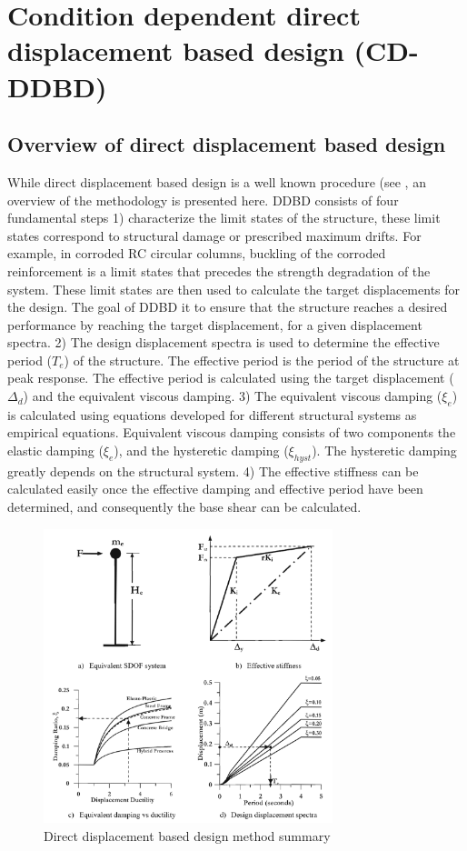 \section{Condition dependent direct displacement based design (CD-DDBD)}
\subsection{Overview of direct displacement based design}

While direct displacement based design is a well known procedure (see \cite{Priestley2007}, an overview of the methodology is presented here. DDBD consists of four fundamental steps 1) characterize the limit states of the structure, these limit states correspond to structural damage or prescribed maximum drifts. For example, in corroded RC circular columns, buckling of the corroded reinforcement is a limit states that precedes the strength degradation of the system. These limit states are then used to calculate the target displacements for the design. The goal of DDBD it to ensure that the structure reaches a desired performance by reaching the target displacement, for a given displacement spectra. 2) The design displacement spectra is used to determine the effective period ($T_e$) of the structure. The effective period is  the period of the structure at peak response. The effective period is calculated using the target displacement ($\Delta_d$) and the equivalent viscous damping. 3) The equivalent viscous damping ($\xi_e$) is calculated using equations developed for different structural systems as empirical equations. Equivalent viscous damping consists of two components the elastic damping ($\xi_e$), and the hysteretic damping ($\xi_{hyst}$). The hysteretic damping greatly depends on the structural system. 4) The effective stiffness can be calculated easily once the effective damping and effective period have been determined, and consequently the base shear can be calculated. 

\begin{figure}[htbp]
	\centering
	\includegraphics[width=0.75\textwidth]{VAC Prelim 2.0/Chapter-5/figs/DDBD.png}
	\caption{Direct displacement based design method summary \cite{Priestley2007}}
	\label{fig:DDBD_sum}
\end{figure}
\newpage
